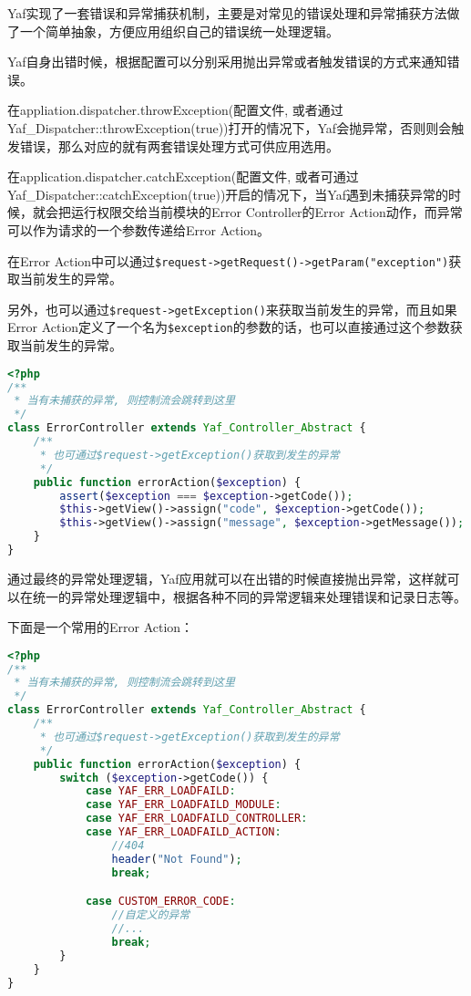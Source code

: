 Yaf实现了一套错误和异常捕获机制，主要是对常见的错误处理和异常捕获方法做了一个简单抽象，方便应用组织自己的错误统一处理逻辑。

Yaf自身出错时候，根据配置可以分别采用抛出异常或者触发错误的方式来通知错误。

在appliation.dispatcher.throwException(配置文件, 或者通过Yaf\_Dispatcher::throwException(true))打开的情况下，Yaf会抛异常，否则则会触发错误，那么对应的就有两套错误处理方式可供应用选用。

在application.dispatcher.catchException(配置文件, 或者可通过Yaf\_Dispatcher::catchException(true))开启的情况下，当Yaf遇到未捕获异常的时候，就会把运行权限交给当前模块的Error Controller的Error Action动作，而异常可以作为请求的一个参数传递给Error Action。

在Error Action中可以通过\texttt{\$request->getRequest()->getParam("exception")}获取当前发生的异常。

另外，也可以通过\texttt{\$request->getException()}来获取当前发生的异常，而且如果Error Action定义了一个名为\texttt{\$exception}的参数的话，也可以直接通过这个参数获取当前发生的异常。




\begin{lstlisting}[language=PHP]
<?php
/**
 * 当有未捕获的异常, 则控制流会跳转到这里
 */
class ErrorController extends Yaf_Controller_Abstract {
    /**
     * 也可通过$request->getException()获取到发生的异常
     */
    public function errorAction($exception) {
        assert($exception === $exception->getCode());
        $this->getView()->assign("code", $exception->getCode());
        $this->getView()->assign("message", $exception->getMessage());
    }
}
\end{lstlisting}

通过最终的异常处理逻辑，Yaf应用就可以在出错的时候直接抛出异常，这样就可以在统一的异常处理逻辑中，根据各种不同的异常逻辑来处理错误和记录日志等。

下面是一个常用的Error Action：


\begin{lstlisting}[language=PHP]
<?php
/**
 * 当有未捕获的异常, 则控制流会跳转到这里
 */
class ErrorController extends Yaf_Controller_Abstract {
    /**
     * 也可通过$request->getException()获取到发生的异常
     */
    public function errorAction($exception) {
        switch ($exception->getCode()) {
            case YAF_ERR_LOADFAILD:
            case YAF_ERR_LOADFAILD_MODULE:
            case YAF_ERR_LOADFAILD_CONTROLLER:
            case YAF_ERR_LOADFAILD_ACTION:
                //404
                header("Not Found");
                break;

            case CUSTOM_ERROR_CODE:
                //自定义的异常
                //...
                break;
        }
    }
}
\end{lstlisting}

